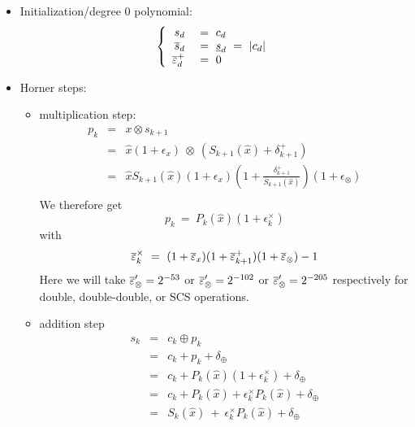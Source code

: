 \begin{itemize}
\item Initialization/degree 0 polynomial: 
  $$ \left\{
    \begin{array}{rl}
      s_d & \ = \ c_d\\
      \overline{s}_{d} & \ = \ \underline{s}_{d} \ = \ |c_d|\\
      {\overline{\varepsilon}}^+_d &\ = \ 0\\
    \end{array}
  \right.
  $$


\item Horner steps: 
  \begin{itemize}
  \item multiplication step:%
    \begin{eqnarray*}
      p_{k}  &=& x \otimes s_{k+1} \\
             &=& \hat{x}(1+\epsilon_x)\ \otimes \ (S_{k+1}(\hat{x}) + \delta^+_{k+1})\\
             &=& \hat{x} S_{k+1}(\hat{x})(1+\epsilon_x)(1 + \frac{\delta^+_{k+1}}{S_{k+1}(\hat{x})})(1+\epsilon_\otimes)\\
    \end{eqnarray*}
    We therefore get 
    \begin{equation}
      p_{k} \ = \ P_{k}(\hat{x})(1+\epsilon^\times_k)\label{eq:pk}
    \end{equation}
    with 
    \begin{equation}
      {\overline{\varepsilon}}^\times_k \ = \ (1+{\overline{\varepsilon}}_x)(1 + {\overline{\varepsilon}}^+_{k+1})(1+{\overline{\varepsilon}}_\otimes) - 1 \label{eq:maxepsp}
    \end{equation}
    Here we will take ${\overline{\varepsilon}}'_\otimes = 2^{-53}$ or
    ${\overline{\varepsilon}}'_\otimes = 2^{-102}$ or ${\overline{\varepsilon}}'_\otimes = 2^{-205}$
    respectively for double, double-double, or SCS operations.
    
  \item addition step 
      \begin{eqnarray*}
        s_{k} &=&  c_k \oplus p_k \\
              &=& c_k + p_k + \delta_\oplus\\
              &=&  c_k + P_k(\hat{x})(1+\epsilon^\times_k) + \delta_\oplus\\
              &=&  c_k + P_k(\hat{x}) + \epsilon^\times_k P_k(\hat{x})  + \delta_\oplus\\
              &=&  S_{k}(\hat{x})\  +\  \epsilon^\times_k P_k(\hat{x}) +  \delta_\oplus \\
      \end{eqnarray*}


\end{itemize}
\end{itemize}
